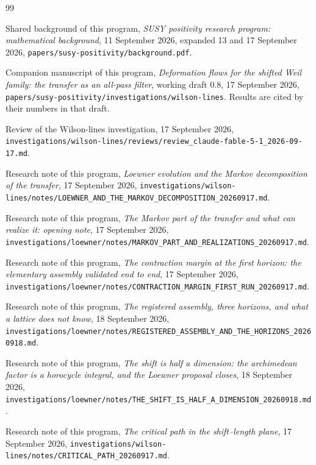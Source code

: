 \begin{thebibliography}{99}
\raggedright
{}
Shared background of this program, \emph{SUSY positivity research program:
mathematical background}, 11 September 2026, expanded 13 and 17 September 2026,
\texttt{papers/susy-positivity/background.pdf}.

Companion manuscript of this program, \emph{Deformation flows for the shifted
Weil family: the transfer as an all-pass filter}, working draft 0.8,
17 September 2026,
\texttt{papers/susy-positivity/investigations/wilson-lines}. Results are cited
by their numbers in that draft.

Review of the Wilson-lines investigation, 17 September 2026,
\texttt{investigations/wilson-lines/reviews/\allowbreak review\_claude-fable-5-1\_2026-09-17.md}.

Research note of this program, \emph{Loewner evolution and the Markov
decomposition of the transfer}, 17 September 2026,
\texttt{investigations/wilson-lines/notes/\allowbreak LOEWNER\_AND\_THE\_MARKOV\_DECOMPOSITION\_20260917.md}.

Research note of this program, \emph{The Markov part of the transfer and what
can realize it: opening note}, 17 September 2026,
\texttt{investigations/loewner/notes/\allowbreak MARKOV\_PART\_AND\_REALIZATIONS\_20260917.md}.

Research note of this program, \emph{The contraction margin at the first
horizon: the elementary assembly validated end to end}, 17 September 2026,
\texttt{investigations/loewner/notes/\allowbreak CONTRACTION\_MARGIN\_FIRST\_RUN\_20260917.md}.

Research note of this program, \emph{The registered assembly, three horizons,
and what a lattice does not know}, 18 September 2026,
\texttt{investigations/loewner/notes/\allowbreak REGISTERED\_ASSEMBLY\_AND\_THE\_HORIZONS\_20260918.md}.

Research note of this program, \emph{The shift is half a dimension: the
archimedean factor is a horocycle integral, and the Loewner proposal closes},
18 September 2026,
\texttt{investigations/loewner/notes/\allowbreak THE\_SHIFT\_IS\_HALF\_A\_DIMENSION\_20260918.md}.

Research note of this program, \emph{The critical path in the shift--length
plane}, 17 September 2026,
\texttt{investigations/wilson-lines/notes/CRITICAL\_PATH\_20260917.md}.


\end{thebibliography}
